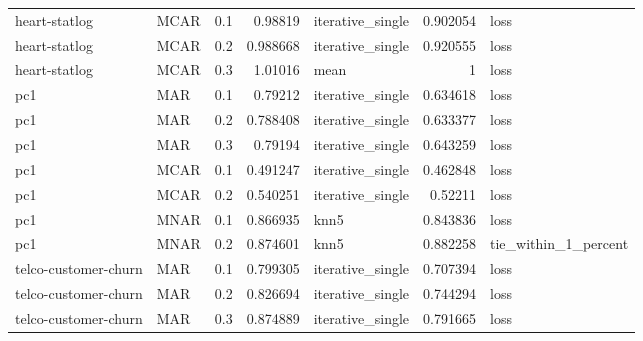 \begin{table}[ht]
{\begin{tabular}{llrrlrl}
 heart-statlog        & MCAR        &         0.1 &                          0.98819  & iterative\_single &                           0.902054 & loss                 \\
 heart-statlog        & MCAR        &         0.2 &                          0.988668 & iterative\_single &                           0.920555 & loss                 \\
 heart-statlog        & MCAR        &         0.3 &                          1.01016  & mean             &                           1        & loss                 \\
 pc1                  & MAR         &         0.1 &                          0.79212  & iterative\_single &                           0.634618 & loss                 \\
 pc1                  & MAR         &         0.2 &                          0.788408 & iterative\_single &                           0.633377 & loss                 \\
 pc1                  & MAR         &         0.3 &                          0.79194  & iterative\_single &                           0.643259 & loss                 \\
 pc1                  & MCAR        &         0.1 &                          0.491247 & iterative\_single &                           0.462848 & loss                 \\
 pc1                  & MCAR        &         0.2 &                          0.540251 & iterative\_single &                           0.52211  & loss                 \\
 pc1                  & MNAR        &         0.1 &                          0.866935 & knn5             &                           0.843836 & loss                 \\
 pc1                  & MNAR        &         0.2 &                          0.874601 & knn5             &                           0.882258 & tie\_within\_1\_percent \\
 telco-customer-churn & MAR         &         0.1 &                          0.799305 & iterative\_single &                           0.707394 & loss                 \\
 telco-customer-churn & MAR         &         0.2 &                          0.826694 & iterative\_single &                           0.744294 & loss                 \\
 telco-customer-churn & MAR         &         0.3 &                          0.874889 & iterative\_single &                           0.791665 & loss                 \\

\end{tabular}}
\end{table}
